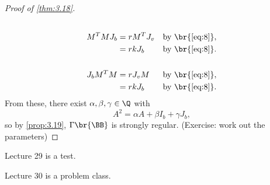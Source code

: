 \begin{proof}[Proof of \ref{thm:3.18}]
\begin{align*}
\\
M^TMJ_b
& = rM^TJ_v & \text{by} \ \br{\ref{eq:8}}, \\
& = rkJ_b & \text{by} \ \br{\ref{eq:8}}. \\
\\
J_bM^TM
& = rJ_vM & \text{by} \ \br{\ref{eq:8}}, \\
& = rkJ_b & \text{by} \ \br{\ref{eq:8}}.
\end{align*}
From these, there exist $ \alpha, \beta, \gamma \in \Q $ with
$$ A^2 = \alpha A + \beta I_b + \gamma J_b, $$
so by \ref{prop:3.19}, $ \Gamma\br{\BB} $ is strongly regular. (Exercise: work out the parameters)
\end{proof}


Lecture 29 is a test.


Lecture 30 is a problem class.


